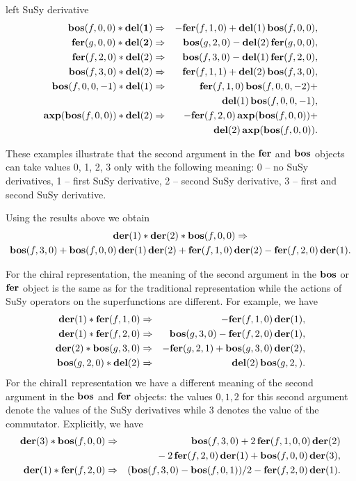{\begin{description}
\item{left SuSy derivative}
  \begin{eqnarray*}
    \mathbf{bos}(f,0,0)*\mathbf{\mathbf{del}(1)} &\Rightarrow& -\mathbf{fer}(f,1,0)+\mathbf{del}(1)\,\mathbf{bos}(f,0,0), \\
    \mathbf{fer}(g,0,0)*\mathbf{\mathbf{del}(2)} &\Rightarrow&  \mathbf{bos}(g,2,0)-\mathbf{del}(2)\,\mathbf{fer}(g,0,0), \\
    \mathbf{fer}(f,2,0)*\mathbf{del}(2) &\Rightarrow& \mathbf{bos}(f,3,0)-\mathbf{del}(1)\,\mathbf{fer}(f,2,0), \\
    \mathbf{bos}(f,3,0)*\mathbf{del}(2) &\Rightarrow& \mathbf{fer}(f,1,1)+\mathbf{del}(2)\,\mathbf{bos}(f,3,0), \\
    \mathbf{bos}(f,0,0,-1)*\mathbf{del}(1) &\Rightarrow& \mathbf{fer}(f,1,0)\,\mathbf{bos}(f,0,0,-2) + \\
    && \mathbf{del}(1)\,\mathbf{bos}(f,0,0,-1), \\
    \mathbf{axp}(\mathbf{bos}(f,0,0))*\mathbf{del}(2) &\Rightarrow&
    -\mathbf{fer}(f,2,0)\,\mathbf{axp}(\mathbf{bos}(f,0,0)) + \\
    && \mathbf{del}(2)\,\mathbf{axp}(\mathbf{bos}(f,0,0)).
  \end{eqnarray*}
\end{description}

These examples illustrate that the second argument in the $\mathbf{fer}$ and
$\mathbf{bos}$ objects can take values 0, 1, 2, 3 only with the following
meaning: 0 -- no SuSy derivatives, 1 -- first SuSy derivative, 2 --
second SuSy derivative, 3 -- first and second SuSy derivative.

Using the results above we obtain
\begin{multline*}
  \mathbf{der}(1)*\mathbf{der}(2)*\mathbf{bos}(f,0,0) \Rightarrow \\
  \mathbf{bos}(f,3,0) + \mathbf{bos}(f,0,0)\,\mathbf{der}(1)\,\mathbf{der}(2) +
  \mathbf{fer}(f,1,0)\,\mathbf{der}(2) - \mathbf{fer}(f,2,0)\,\mathbf{der}(1).
\end{multline*}

For the chiral representation, the meaning of the second argument in
the $\mathbf{bos}$ or $\mathbf{fer}$ object is the same as for the traditional
representation while the actions of SuSy operators on the
superfunctions are different.  For example, we have
\begin{eqnarray*}
  \mathbf{der}(1)*\mathbf{fer}(f,1,0) &\Rightarrow& -\mathbf{fer}(f,1,0)\,\mathbf{der}(1), \\
  \mathbf{der}(1)*\mathbf{fer}(f,2,0) &\Rightarrow& \mathbf{bos}(g,3,0) - \mathbf{fer}(f,2,0)\,\mathbf{der}(1), \\
  \mathbf{der}(2)*\mathbf{bos}(g,3,0) &\Rightarrow& -\mathbf{fer}(g,2,1) + \mathbf{bos}(g,3,0)\,\mathbf{der}(2), \\
  \mathbf{bos}(g,2,0)*\mathbf{del}(2) &\Rightarrow& \mathbf{del}(2)\,\mathbf{bos}(g,2,).
\end{eqnarray*}
For the chiral1 representation we have a different meaning of the
second argument in the $\mathbf{bos}$ and $\mathbf{fer}$ objects: the values $0,1,2$
for this second argument denote the values of the SuSy derivatives
while 3 denotes the value of the commutator.  Explicitly, we have
\begin{eqnarray*}
  \mathbf{der}(3)*\mathbf{bos}(f,0,0) &\Rightarrow& \mathbf{bos}(f,3,0) + 2\,\mathbf{fer}(f,1,0,0)\,\mathbf{der}(2) \\
  && \mbox{} - 2\,\mathbf{fer}(f,2,0)\,\mathbf{der}(1) + \mathbf{bos}(f,0,0)\,\mathbf{der}(3), \\
  \mathbf{der}(1)*\mathbf{fer}(f,2,0) &\Rightarrow& (\mathbf{bos}(f,3,0)-\mathbf{bos}(f,0,1))/2 - \mathbf{fer}(f,2,0)\,\mathbf{der}(1).
\end{eqnarray*}

}
